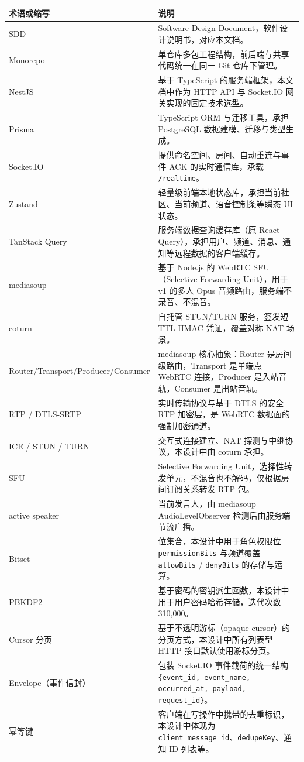 \noindent\begin{tabularx}{\textwidth}{L{3.6cm}Y}
  \toprule
  术语或缩写 & 说明 \\
  \midrule
  SDD & Software Design Document，软件设计说明书，对应本文档。 \\
  Monorepo & 单仓库多包工程结构，前后端与共享代码统一在同一 Git 仓库下管理。 \\
  NestJS & 基于 TypeScript 的服务端框架，本文档中作为 HTTP API 与 Socket.IO 网关实现的固定技术选型。 \\
  Prisma & TypeScript ORM 与迁移工具，承担 PostgreSQL 数据建模、迁移与类型生成。 \\
  Socket.IO & 提供命名空间、房间、自动重连与事件 ACK 的实时通信库，承载 \texttt{/realtime}。 \\
  Zustand & 轻量级前端本地状态库，承担当前社区、当前频道、语音控制条等瞬态 UI 状态。 \\
  TanStack Query & 服务端数据查询缓存库（原 React Query），承担用户、频道、消息、通知等远程数据的客户端缓存。 \\
  mediasoup & 基于 Node.js 的 WebRTC SFU（Selective Forwarding Unit），用于 v1 的多人 Opus 音频路由，服务端不录音、不混音。 \\
  coturn & 自托管 STUN/TURN 服务，签发短 TTL HMAC 凭证，覆盖对称 NAT 场景。 \\
  Router/Transport/Producer/Consumer & mediasoup 核心抽象：Router 是房间级路由，Transport 是单端点 WebRTC 连接，Producer 是入站音轨，Consumer 是出站音轨。 \\
  RTP / DTLS-SRTP & 实时传输协议与基于 DTLS 的安全 RTP 加密层，是 WebRTC 数据面的强制加密通道。 \\
  ICE / STUN / TURN & 交互式连接建立、NAT 探测与中继协议，本设计中由 coturn 承担。 \\
  SFU & Selective Forwarding Unit，选择性转发单元，不混音也不解码，仅根据房间订阅关系转发 RTP 包。 \\
  active speaker & 当前发言人，由 mediasoup AudioLevelObserver 检测后由服务端节流广播。 \\
  Bitset & 位集合，本设计中用于角色权限位 \texttt{permissionBits} 与频道覆盖 \texttt{allowBits} / \texttt{denyBits} 的存储与运算。 \\
  PBKDF2 & 基于密码的密钥派生函数，本设计中用于用户密码哈希存储，迭代次数 310{,}000。 \\
  Cursor 分页 & 基于不透明游标（opaque cursor）的分页方式，本设计中所有列表型 HTTP 接口默认使用游标分页。 \\
  Envelope（事件信封） & 包装 Socket.IO 事件载荷的统一结构 \texttt{\{event\_id, event\_name, occurred\_at, payload, request\_id\}}。 \\
  幂等键 & 客户端在写操作中携带的去重标识，本设计中体现为 \texttt{client\_message\_id}、\texttt{dedupeKey}、通知 ID 列表等。 \\
  \bottomrule
\end{tabularx}

